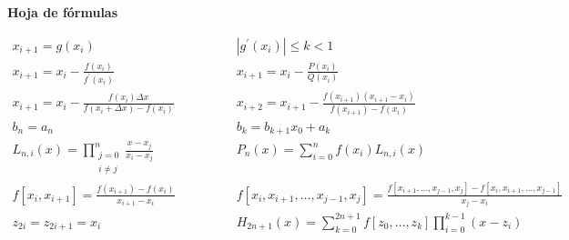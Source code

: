\documentclass[12pt]{article}
\newcommand{\diff}[3]{\frac{d^{#3} #1}{d#2^{#3}}}
\newcommand{\pdiff}[3]{\frac{\partial^{#3} #1}{\partial#2^{#3}}}
\newcommand{\abs}[1]{\left| #1 \right|}
\begin{document}
\begin{center}
\textbf{Hoja de fórmulas}
\vspace{-.5cm}
\end{center}
{\large
\[
\begin{array}{cc}
x_{i+1} = g(x_i) \qquad & \qquad |g^\prime(x_i)| \leq k < 1 \\
x_{i+1} = x_i - \frac{f(x_i)}{f^\prime(x_i)} \qquad & \qquad x_{i+1} = x_i - \frac{P(x_i)}{Q(x_i)} \\
x_{i+1} = x_i - \frac{f(x_i) \Delta x}{f(x_i + \Delta x) - f(x_i)} \qquad & \qquad x_{i+2} = x_{i+1} - \frac{f(x_{i+1}) (x_{i+1}-x_i)}{f(x_{i+1}) - f(x_i)} \\ 
b_n = a_n \qquad & \qquad
b_k = b_{k+1}x_0 + a_k \\
L_{n, i}(x) = \prod\limits_{\substack{j=0\\ i \neq j}}^n \frac{x - x_j}{x_i - x_j} \qquad & \qquad
P_n(x) = \sum\limits_{i = 0}^n f(x_i)L_{n,i}(x) \\
f\left[x_i, x_{i+1}\right] = \frac{f(x_{i+1})-f(x_i)}{x_{i+1}-x_i} \qquad & \qquad
f\left[ x_i, x_{i+1}, \ldots, x_{j-1}, x_j\right] = \frac{f\left[x_{i+1}, \ldots, x_{j-1}, x_j\right] - f\left[ x_i, x_{i+1}, \ldots, x_{j-1} \right]}{x_j - x_i} \\
z_{2i} = z_{2i+1} = x_i \qquad & \qquad
H_{2n+1}(x) = \sum\limits_{k=0}^{2n+1} f\left[z_0, \ldots, z_k\right] \prod\limits_{i = 0}^{k-1}(x-z_i) %

\end{array}\]}
\end{document}
